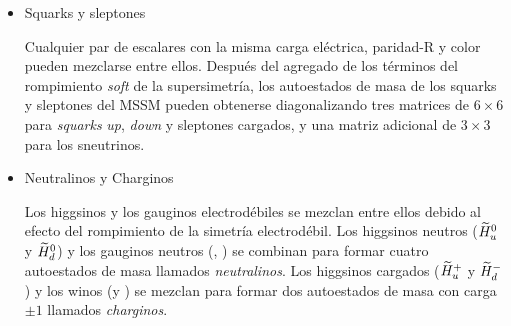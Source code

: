 \begin{itemize}\itemsep0.2cm\parskip0.2cm

\item Squarks y sleptones

  Cualquier par de escalares con la misma carga eléctrica, paridad-R y color
  pueden mezclarse entre ellos. Después del agregado de los términos del
  rompimiento \emph{soft} de la supersimetría, los autoestados de masa de los squarks y
  sleptones del MSSM pueden obtenerse diagonalizando tres matrices de $6\times6$
  para \emph{squarks} \emph{up}, \emph{down} y sleptones cargados, y una matriz adicional de $3\times
  3$ para los sneutrinos.




\item Neutralinos y Charginos

Los higgsinos y los gauginos electrodébiles se mezclan entre ellos debido al
efecto del rompimiento de la simetría electrodébil. Los higgsinos neutros
($\widetilde{H}_u^0$ y $\widetilde{H}_d^0$) y los gauginos neutros (\bino, \winozero) se
combinan para formar cuatro autoestados de masa llamados \emph{neutralinos}.
Los higgsinos cargados ($\widetilde{H}_u^+$ y $\widetilde{H}_d^-$) y los winos (\winop y
\winom) se mezclan para formar dos autoestados de masa con carga $\pm 1$
llamados \emph{charginos}.


\end{itemize}
